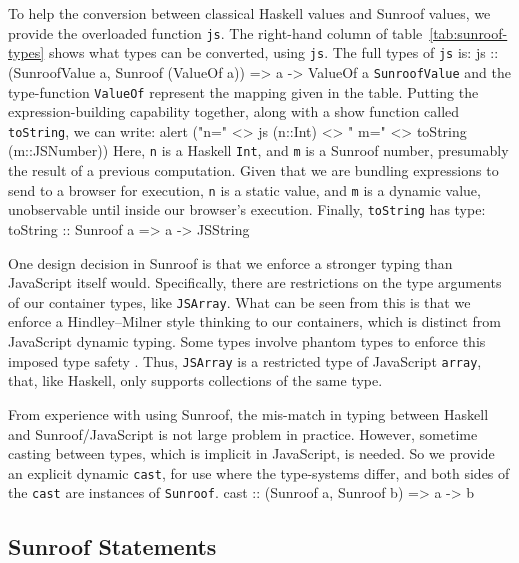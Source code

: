 \documentclass{llncs}
\newcommand{\Src}[1]{{\tt{#1}}}
\newenvironment{Code}{\verbatim}{\endverbatim}
\begin{document}
To help the conversion between classical Haskell values and Sunroof values,
we provide the overloaded function \Src{js}. The right-hand column of 
table~\ref{tab:sunroof-types} shows what types can be converted, using \Src{js}.
The full types of \Src{js} is:
\begin{Code}
js :: (SunroofValue a, Sunroof (ValueOf a)) => a -> ValueOf a
\end{Code}
\Src{SunroofValue} and the type-function \Src{ValueOf} represent the mapping given in the table.
%
Putting the expression-building capability together, 
along with a show function called \Src{toString}, we can write:
\begin{Code}
  alert ("n=" <> js (n::Int) <> " m=" <> toString (m::JSNumber))
\end{Code}
Here, \Src{n} is a Haskell \Src{Int}, and \Src{m} is a Sunroof number,
presumably the result of a previous computation. Given that we are 
bundling expressions to send to a browser for execution, \Src{n}
is a static value, and \Src{m} is a dynamic value, unobservable until inside our browser's execution.
Finally, \Src{toString} has type:
\begin{Code}
toString :: Sunroof a => a -> JSString
\end{Code}

One design decision in Sunroof is that we enforce a stronger typing than JavaScript itself would.
Specifically, there are restrictions on the type arguments of our container types,
like \Src{JSArray}. What can be seen from this is that we
enforce a Hindley–Milner style thinking to our containers,
which is distinct from JavaScript dynamic typing.
Some types involve
phantom types to enforce this imposed type safety \cite{Leijen:99:Phantom}.
Thus, \Src{JSArray} is a restricted type of JavaScript \Src{array}, that, like Haskell,
only supports collections of the same type.

From experience with using Sunroof,
the mis-match in typing between Haskell and Sunroof/JavaScript
is not large problem in practice.
However, sometime casting between types, which is implicit in JavaScript,
is needed. So we provide an explicit dynamic \Src{cast},
for use where the type-systems differ,
and both sides of the \Src{cast} are instances of \Src{Sunroof}.
\begin{Code}
cast :: (Sunroof a, Sunroof b) => a -> b
\end{Code}

\subsection{Sunroof Statements}
\end{document}
